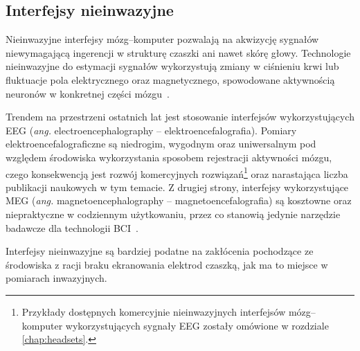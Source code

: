 \documentclass[skorowidz,skroty]{dyplomWEZUT}
\begin{document}
\pagebreak

\subsection{Interfejsy nieinwazyjne}
Nieinwazyjne interfejsy mózg--komputer pozwalają na akwizycję sygnałów niewymagającą ingerencji w strukturę czaszki ani nawet skórę głowy. Technologie nieinwazyjne do estymacji sygnałów wykorzystują zmiany w ciśnieniu krwi lub fluktuacje pola elektrycznego oraz magnetycznego, spowodowane aktywnością neuronów w konkretnej części mózgu~\cite{bci_introduction}.

Trendem na przestrzeni ostatnich lat jest stosowanie interfejsów wykorzystujących EEG (\textit{ang.} electroencephalography -- elektroencefalografia). Pomiary elektroencefalograficzne są niedrogim, wygodnym oraz uniwersalnym pod względem środowiska wykorzystania sposobem rejestracji aktywności mózgu, czego konsekwencją jest rozwój komercyjnych rozwiązań{\footnote{Przykłady dostępnych komercyjnie nieinwazyjnych interfejsów mózg--komputer wykorzystujących sygnały EEG zostały omówione w rozdziale \vref{chap:headsets}.}} oraz narastająca liczba publikacji naukowych w tym temacie. Z drugiej strony, interfejsy wykorzystujące MEG (\textit{ang.} magnetoencephalography -- magnetoencefalografia)  są kosztowne oraz niepraktyczne w codziennym użytkowaniu, przez co stanowią jedynie narzędzie badawcze dla technologii BCI~\cite{bci_principles}.

Interfejsy nieinwazyjne są bardziej podatne na zakłócenia pochodzące ze środowiska z racji braku ekranowania elektrod czaszką, jak ma to miejsce w pomiarach inwazyjnych.
\end{document}

